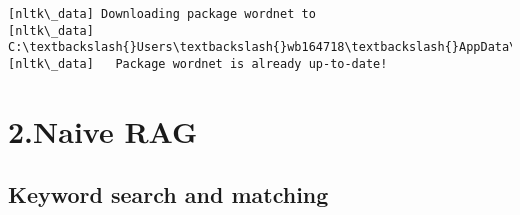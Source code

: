 \documentclass[11pt]{article}
\begin{document}
    \begin{Verbatim}[commandchars=\\\{\}]
[nltk\_data] Downloading package wordnet to
[nltk\_data]     C:\textbackslash{}Users\textbackslash{}wb164718\textbackslash{}AppData\textbackslash{}Roaming\textbackslash{}nltk\_data{\ldots}
[nltk\_data]   Package wordnet is already up-to-date!
    \end{Verbatim}

    \section{2.Naive RAG}\label{naive-rag}

    \subsection{Keyword search and
matching}\label{keyword-search-and-matching}
\end{document}
